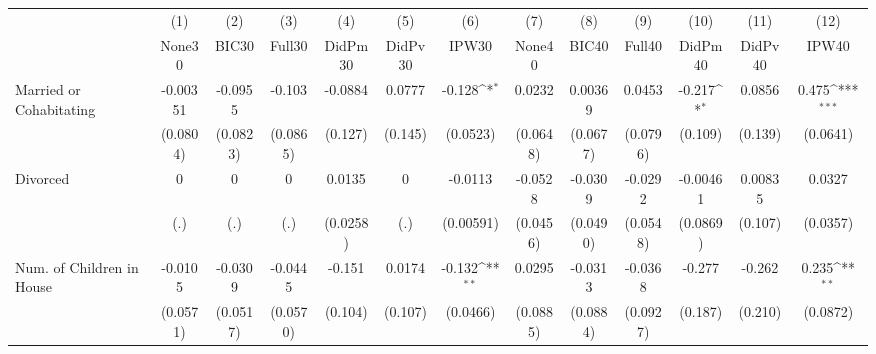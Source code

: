 {
\def\sym#1{\ifmmode^{#1}\else\(^{#1}\)\fi}
\begin{tabular}{l*{12}{c}}
\toprule
            &\multicolumn{1}{c}{(1)}&\multicolumn{1}{c}{(2)}&\multicolumn{1}{c}{(3)}&\multicolumn{1}{c}{(4)}&\multicolumn{1}{c}{(5)}&\multicolumn{1}{c}{(6)}&\multicolumn{1}{c}{(7)}&\multicolumn{1}{c}{(8)}&\multicolumn{1}{c}{(9)}&\multicolumn{1}{c}{(10)}&\multicolumn{1}{c}{(11)}&\multicolumn{1}{c}{(12)}\\
            &\multicolumn{1}{c}{None30}&\multicolumn{1}{c}{BIC30}&\multicolumn{1}{c}{Full30}&\multicolumn{1}{c}{DidPm30}&\multicolumn{1}{c}{DidPv30}&\multicolumn{1}{c}{IPW30}&\multicolumn{1}{c}{None40}&\multicolumn{1}{c}{BIC40}&\multicolumn{1}{c}{Full40}&\multicolumn{1}{c}{DidPm40}&\multicolumn{1}{c}{DidPv40}&\multicolumn{1}{c}{IPW40}\\
\midrule
Married or Cohabitating&    -0.00351         &     -0.0955         &      -0.103         &     -0.0884         &      0.0777         &      -0.128\sym{*}  &      0.0232         &     0.00369         &      0.0453         &      -0.217\sym{*}  &      0.0856         &       0.475\sym{***}\\
            &    (0.0804)         &    (0.0823)         &    (0.0865)         &     (0.127)         &     (0.145)         &    (0.0523)         &    (0.0648)         &    (0.0677)         &    (0.0796)         &     (0.109)         &     (0.139)         &    (0.0641)         \\
\addlinespace
Divorced    &           0         &           0         &           0         &      0.0135         &           0         &     -0.0113         &     -0.0528         &     -0.0309         &     -0.0292         &    -0.00461         &     0.00835         &      0.0327         \\
            &         (.)         &         (.)         &         (.)         &    (0.0258)         &         (.)         &   (0.00591)         &    (0.0456)         &    (0.0490)         &    (0.0548)         &    (0.0869)         &     (0.107)         &    (0.0357)         \\
\addlinespace
Num. of Children in House&     -0.0105         &     -0.0309         &     -0.0445         &      -0.151         &      0.0174         &      -0.132\sym{**} &      0.0295         &     -0.0313         &     -0.0368         &      -0.277         &      -0.262         &       0.235\sym{**} \\
            &    (0.0571)         &    (0.0517)         &    (0.0570)         &     (0.104)         &     (0.107)         &    (0.0466)         &    (0.0885)         &    (0.0884)         &    (0.0927)         &     (0.187)         &     (0.210)         &    (0.0872)         \\

\end{tabular}}
